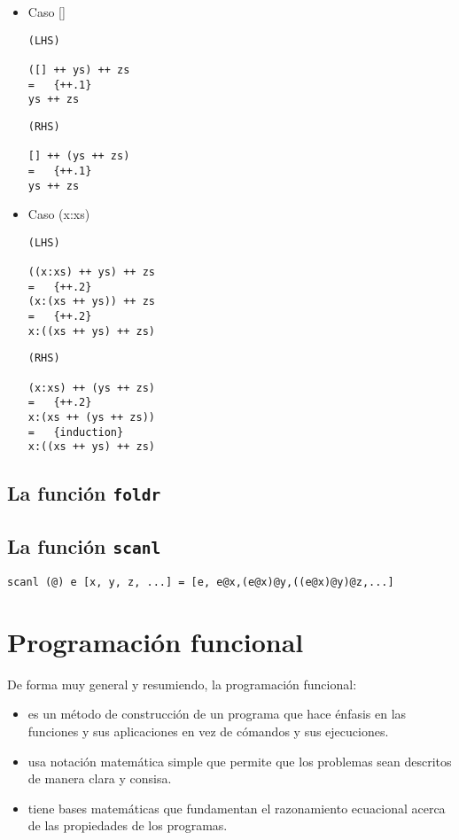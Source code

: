 \begin{itemize}
\item Caso []
\begin{verbatim}
(LHS)

([] ++ ys) ++ zs
=   {++.1}
ys ++ zs
\end{verbatim}

\begin{verbatim}
(RHS)

[] ++ (ys ++ zs)
=   {++.1}
ys ++ zs
\end{verbatim}

\item Caso (x:xs)
\begin{verbatim}
(LHS)

((x:xs) ++ ys) ++ zs
=   {++.2}
(x:(xs ++ ys)) ++ zs
=   {++.2}
x:((xs ++ ys) ++ zs)
\end{verbatim}

\begin{verbatim}
(RHS)

(x:xs) ++ (ys ++ zs)
=   {++.2}
x:(xs ++ (ys ++ zs))
=   {induction}
x:((xs ++ ys) ++ zs)
\end{verbatim}

\end{itemize}

\subsection*{La función \texttt{foldr}}
\subsection*{La función \texttt{scanl}}

\begin{verbatim}
scanl (@) e [x, y, z, ...] = [e, e@x,(e@x)@y,((e@x)@y)@z,...]

\end{verbatim}



\section{Programación funcional}
De forma muy general y resumiendo, la programación funcional:
\begin{itemize}
    \item es un método de construcción de un programa que hace énfasis en las funciones y sus aplicaciones
    en vez de cómandos y sus ejecuciones.

    \item usa notación matemática simple que permite que los problemas sean descritos de manera clara
    y consisa.
    \item tiene bases matemáticas que fundamentan el razonamiento ecuacional acerca de las propiedades de
    los programas.
\end{itemize}

